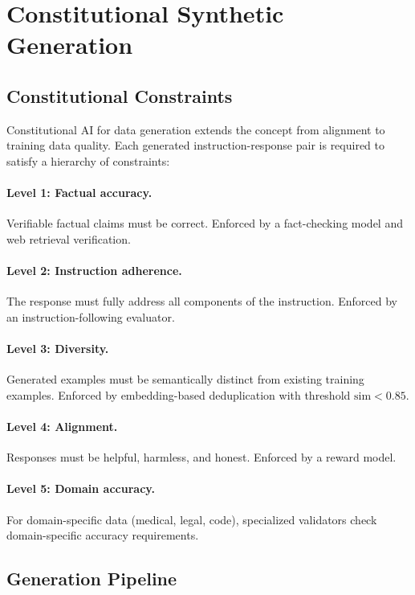 \documentclass[11pt,a4paper]{article}
\begin{document}
\section{Constitutional Synthetic Generation}

\subsection{Constitutional Constraints}

Constitutional AI for data generation extends the concept from alignment to training data quality. Each generated instruction-response pair is required to satisfy a hierarchy of constraints:

\paragraph{Level 1: Factual accuracy.} Verifiable factual claims must be correct. Enforced by a fact-checking model and web retrieval verification.

\paragraph{Level 2: Instruction adherence.} The response must fully address all components of the instruction. Enforced by an instruction-following evaluator.

\paragraph{Level 3: Diversity.} Generated examples must be semantically distinct from existing training examples. Enforced by embedding-based deduplication with threshold $\text{sim} < 0.85$.

\paragraph{Level 4: Alignment.} Responses must be helpful, harmless, and honest. Enforced by a reward model.

\paragraph{Level 5: Domain accuracy.} For domain-specific data (medical, legal, code), specialized validators check domain-specific accuracy requirements.

\subsection{Generation Pipeline}
\end{document}
